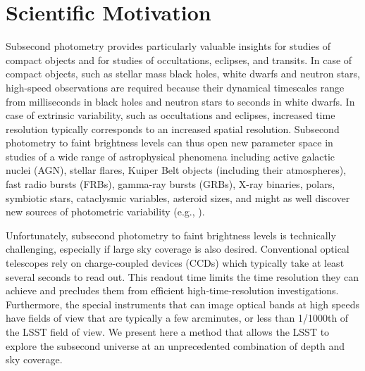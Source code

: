 \documentclass[12pt, letterpaper]{article}
\begin{document}
\clearpage

\section{Scientific Motivation}


Subsecond photometry provides particularly valuable insights for studies of compact 
objects and for studies of occultations, eclipses, and transits. In case of compact objects, 
such as stellar mass black holes, white dwarfs and neutron stars, high-speed observations
are required because their dynamical timescales range from milliseconds in black holes and 
neutron stars to seconds in white dwarfs. In case of extrinsic variability, such as occultations 
and eclipses, increased time resolution typically corresponds to an increased spatial resolution. 
Subsecond photometry to faint brightness levels can thus open new parameter space in studies 
of a wide range of astrophysical phenomena including active galactic nuclei (AGN), stellar flares, Kuiper Belt objects (including their atmospheres), fast radio bursts (FRBs), gamma-ray 
bursts (GRBs), X-ray binaries, polars, symbiotic stars, cataclysmic variables, asteroid sizes, and
might as well discover new sources of photometric variability (e.g., \citealt{D2011, KRS2014, 
Gandhi2016}). 

Unfortunately, subsecond photometry to faint brightness levels is technically challenging, especially
if large sky coverage is also desired. Conventional optical telescopes rely on charge-coupled devices 
(CCDs) which typically take at least several seconds to read out. This readout time limits the time 
resolution they can achieve and precludes them from efficient high-time-resolution investigations. 
Furthermore, the special instruments that can image optical bands at high speeds have fields of view 
that are typically a few arcminutes, or less than 1/1000th of the LSST field of view. We present here 
a method that allows the LSST to explore the subsecond universe at an unprecedented combination of 
depth and sky coverage. 
\end{document}
